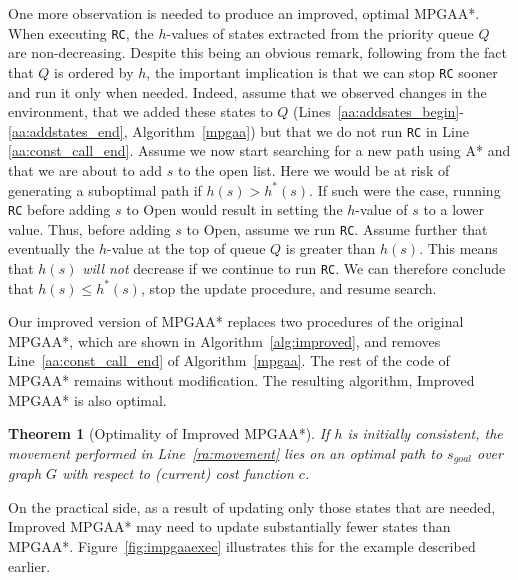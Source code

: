 \documentclass{article}
\newcommand{\proofsketchstring}{Proof sketch}
\newenvironment{pfsketch}[1][]{\noindent\textbf{\proofsketchstring\ifthenelse{\equal{#1}{}}{:}{~(#1) :}}\xspace}{\hfill\QED\medskip\par}
\newcommand{\QED}{\hfill$\blacksquare$\vspace{0pt}}
\newtheorem{theorem}{Theorem}
\newcommand{\sgoal}{\ensuremath{s_{\mathit{goal}}}\xspace}
\begin{document}
One more observation is needed to produce an improved, optimal MPGAA*. When executing \texttt{RC}, the $h$-values of states extracted from the priority queue $Q$ are non-decreasing. Despite this being an obvious remark, following from the fact that $Q$ is ordered by $h$, the important implication is that we can stop  \texttt{RC} sooner and run it only when needed. Indeed, assume that we observed changes in the environment, that we added these states to $Q$ (Lines~\ref{aa:addsates_begin}-\ref{aa:addstates_end}, Algorithm~\ref{mpgaa}) but that we do not run \texttt{RC} in Line \ref{aa:const_call_end}. Assume we now start searching for a new path using A* and that we are about to add $s$ to the open list. Here we would be at risk of generating a suboptimal path if $h(s)>h^*(s)$. If such were the case, running \texttt{RC} before adding $s$ to Open would result in setting the $h$-value of $s$ to a lower value. Thus, before adding $s$ to Open, assume we run \texttt{RC}. Assume further that eventually the $h$-value at the top of queue $Q$ is greater than $h(s)$. This means that $h(s)$ \emph{will not} decrease if we continue to run \texttt{RC}. We can therefore conclude that $h(s)\leq h^*(s)$, stop the update procedure, and resume search.



Our improved version of MPGAA* replaces two procedures of the original MPGAA*, which are shown in Algorithm~\ref{alg:improved}, and removes  Line~\ref{aa:const_call_end} of Algorithm~\ref{mpgaa}. The rest of the code of MPGAA* remains without modification. The resulting algorithm, Improved MPGAA* is also optimal.

\begin{theorem}[Optimality of Improved MPGAA*]\label{thm:optimalgaa}
  If $h$ is initially consistent, the movement performed in
  Line~\ref{ra:movement} lies on an optimal path to $\sgoal$ over
  graph $G$ with respect to (current) cost function $c$.
\end{theorem}

On the practical side, as a result of updating only those states that are needed, Improved MPGAA* may need to update substantially fewer states than MPGAA*. Figure~\ref{fig:impgaaexec} illustrates this for the example described earlier.
\end{document}
